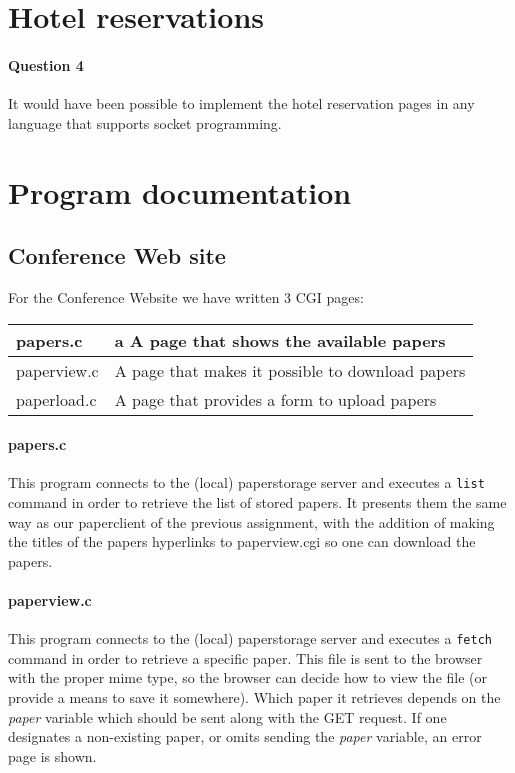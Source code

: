 \documentclass[a4paper,10pt]{article}
\begin{document}
\section{Hotel reservations}
\paragraph{Question 4}
It would have been possible to implement the hotel reservation pages in any language
that supports socket programming.

\section{Program documentation}
\subsection{Conference Web site}
For the Conference Website we have written 3 CGI pages:
\begin{center}
\begin{tabular}{ l | p{9cm} }
papers.c & a A page that shows the available papers\\ \hline
paperview.c & A page that makes it possible to download papers\\ \hline
paperload.c & A page that provides a form to upload papers\\
\end{tabular}
\end{center}

\paragraph{papers.c}
This program connects to the (local) paperstorage server and executes a \texttt{list}
command in order to retrieve the list of stored papers. It presents them the same way
as our paperclient of the previous assignment, with the addition of making the titles
of the papers hyperlinks to paperview.cgi so one can download the papers.

\paragraph{paperview.c}
This program connects to the (local) paperstorage server and executes a \texttt{fetch}
command in order to retrieve a specific paper. This file is sent to the browser with
the proper mime type, so the browser can decide how to view the file (or provide a
means to save it somewhere). Which paper it retrieves depends on the \textit{paper}
variable which should be sent along with the \textsc{GET} request. If one designates
a non-existing paper, or omits sending the \textit{paper} variable, an error page is
shown.
\end{document}
